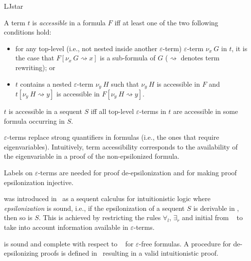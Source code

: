 \begin{entry}{LJstar}
\begin{clarifications}
A term $t$ is \emph{accessible} in a formula $F$ iff at least one of the two
following conditions hold: 
\begin{itemize}
  \item for any top-level (i.e., not nested inside another $\varepsilon$-term)
  $\varepsilon$-term $\nu_x~G$ in $t$, it is the case that $F[\nu_x~G
  \rightsquigarrow x]$ is a sub-formula of $G$ ($\rightsquigarrow$ denotes term
  rewriting); or

  \item $t$ contains a nested $\varepsilon$-term $\nu_y~H$ such that $\nu_y~H$
  is accessible in $F$ and $t[\nu_y~H \rightsquigarrow y]$ is accessible in
  $F[\nu_y~H \rightsquigarrow y]$.
\end{itemize}
$t$ is accessible in a sequent $S$ iff all top-level
$\varepsilon$-terms in $t$ are accessible in some formula occurring in $S$.

$\varepsilon$-terms replace strong quantifiers in formulas (i.e., the ones
that require eigenvariables).
Intuitively, term accessibility corresponds to the availability of the
eigenvariable in a proof of the non-epsilonized formula.

Labels on $\varepsilon$-terms are needed for proof de-epsilonization
and for making proof epsilonization injective.
\end{clarifications}

\begin{history}
\LJstar was introduced in~\cite{Reis2016} as a sequent calculus for
intuitionistic logic where \emph{epsilonization} is sound, i.e., if the
epsilonization of a sequent $S$ is derivable in \LJstar, then so is $S$.
%
This is achieved by restricting the rules $\forall_l$, $\exists_r$ and initial
from \LJ~ to take into account information available in
$\varepsilon$-terms.
\end{history}

\begin{technicalities}
\LJstar is sound and complete with respect to \LJ~ for
$\varepsilon$-free formulas. A procedure for de-epsilonizing \LJstar proofs is
defined in~\cite{Reis2016} resulting in a valid intuitionistic proof.
\end{technicalities}

\end{entry}
